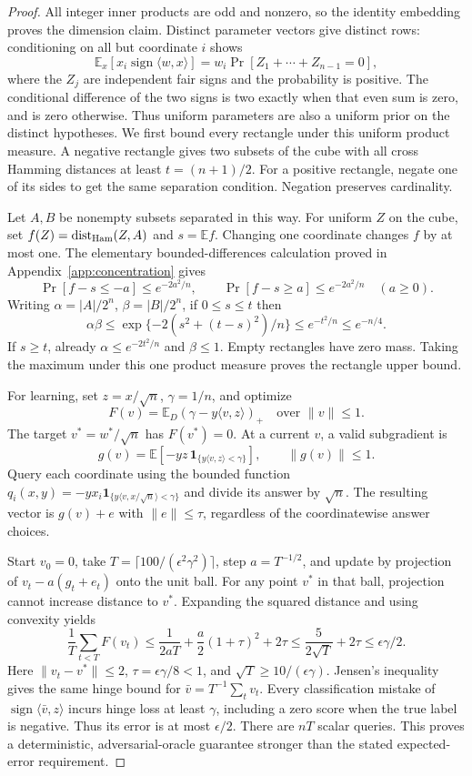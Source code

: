 \documentclass[11pt]{article}
\DeclareMathOperator{\sign}{sign}
\newcommand{\E}{\mathbb E}
\newcommand{\1}{\mathbf 1}
\begin{document}
\begin{proof}
All integer inner products are odd and nonzero, so the identity embedding proves the dimension claim. Distinct parameter vectors give distinct rows: conditioning on all but coordinate $i$ shows
\[
 \E_x[x_i\sign\langle w,x\rangle]
 =w_i\Pr[Z_1+\cdots+Z_{n-1}=0],
\]
where the $Z_j$ are independent fair signs and the probability is positive. The conditional difference of the two signs is two exactly when that even sum is zero, and is zero otherwise. Thus uniform parameters are also a uniform prior on the distinct hypotheses. We first bound every rectangle under this uniform product measure. A negative rectangle gives two subsets of the cube with all cross Hamming distances at least $t=(n+1)/2$. For a positive rectangle, negate one of its sides to get the same separation condition. Negation preserves cardinality.

Let $A,B$ be nonempty subsets separated in this way. For uniform $Z$ on the cube, set $f(Z)=\operatorname{dist}_{\rm Ham}(Z,A)$ and $s=\E f$. Changing one coordinate changes $f$ by at most one. The elementary bounded-differences calculation proved in Appendix~\ref{app:concentration} gives
\[
 \Pr[f-s\le-a]\le e^{-2a^2/n},\qquad
 \Pr[f-s\ge a]\le e^{-2a^2/n}\quad(a\ge0).
\]
Writing $\alpha=|A|/2^n$, $\beta=|B|/2^n$, if $0\le s\le t$ then
\[
 \alpha\beta\le\exp\{-2(s^2+(t-s)^2)/n\}
 \le e^{-t^2/n}\le e^{-n/4}.
\]
If $s\ge t$, already $\alpha\le e^{-2t^2/n}$ and $\beta\le1$. Empty rectangles have zero mass. Taking the maximum under this one product measure proves the rectangle upper bound.

For learning, set $z=x/\sqrt n$, $\gamma=1/n$, and optimize
\[
 F(v)=\E_D(\gamma-y\langle v,z\rangle)_+
 \quad\text{over }\|v\|\le1.
\]
The target $v^*=w^*/\sqrt n$ has $F(v^*)=0$. At a current $v$, a valid subgradient is
\[
 g(v)=\E[-yz\,\1_{\{y\langle v,z\rangle<\gamma\}}],\qquad\|g(v)\|\le1.
\]
Query each coordinate using the bounded function
$q_i(x,y)=-yx_i\1_{\{y\langle v,x/\sqrt n\rangle<\gamma\}}$ and divide its answer by $\sqrt n$. The resulting vector is $g(v)+e$ with $\|e\|\le\tau$, regardless of the coordinatewise answer choices.

Start $v_0=0$, take $T=\lceil100/(\epsilon^2\gamma^2)\rceil$, step $a=T^{-1/2}$, and update by projection of $v_t-a(g_t+e_t)$ onto the unit ball. For any point $v^*$ in that ball, projection cannot increase distance to $v^*$. Expanding the squared distance and using convexity yields
\[
 \frac1T\sum_{t<T}F(v_t)
 \le\frac1{2aT}+\frac a2(1+\tau)^2+2\tau
 \le\frac{5}{2\sqrt T}+2\tau
 \le\epsilon\gamma/2.
\]
Here $\|v_t-v^*\|\le2$, $\tau=\epsilon\gamma/8<1$, and $\sqrt T\ge10/(\epsilon\gamma)$. Jensen's inequality gives the same hinge bound for $\bar v=T^{-1}\sum_t v_t$. Every classification mistake of $\sign\langle\bar v,z\rangle$ incurs hinge loss at least $\gamma$, including a zero score when the true label is negative. Thus its error is at most $\epsilon/2$. There are $nT$ scalar queries. This proves a deterministic, adversarial-oracle guarantee stronger than the stated expected-error requirement.
\end{proof}
\end{document}
